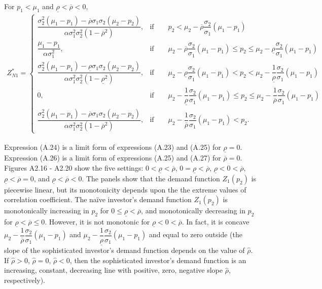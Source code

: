 \documentclass[10pt]{article}
\begin{document}
For $ p_1 < \mu_1 $ and $ \underline{\rho} < \overline{\rho} < 0 $,
{\footnotesize \begin{eqnarray}
Z_{N 1}^* = \left\{ \begin{matrix}
\dfrac{\sigma_2^2 (\mu_1 - p_1) - \overline{\rho} \sigma_1 \sigma_2 (\mu_2 - p_2)}{\alpha \sigma_1^2 \sigma_2^2 (1 - \overline{\rho}^2)}, & \text{if} \qquad p_2 < \mu_2 - \overline{\rho} \dfrac{\sigma_2}{\sigma_1} (\mu_1 - p_1) \\
\dfrac{\mu_1 - p_1}{\alpha \sigma_1^2}, & \text{if} \qquad \mu_2 - \overline{\rho} \dfrac{\sigma_2}{\sigma_1} (\mu_1 - p_1) \leqslant p_2 \leqslant \mu_2 - \underline{\rho} \dfrac{\sigma_2}{\sigma_1} (\mu_1 - p_1) \\
\dfrac{\sigma_2^2 (\mu_1 - p_1) - \underline{\rho} \sigma_1 \sigma_2 (\mu_2 - p_2)}{\alpha \sigma_1^2 \sigma_2^2 (1 - \underline{\rho}^2)}, & \text{if} \qquad \mu_2 - \underline{\rho} \dfrac{\sigma_2}{\sigma_1} (\mu_1 - p_1) < p_2 < \mu_2 - \dfrac1{\underline{\rho}} \dfrac{\sigma_2}{\sigma_1} (\mu_1 - p_1) \\
0, & \text{if} \qquad \mu_2 - \dfrac1{\underline{\rho}} \dfrac{\sigma_2}{\sigma_1} (\mu_1 - p_1) \leqslant p_2 \leqslant \mu_2 - \dfrac1{\overline{\rho}} \dfrac{\sigma_2}{\sigma_1} (\mu_1 - p_1) \\
\dfrac{\sigma_2^2 (\mu_1 - p_1) - \overline{\rho} \sigma_1 \sigma_2 (\mu_2 - p_2)}{\alpha \sigma_1^2 \sigma_2^2 (1 - \overline{\rho}^2)}, & \text{if} \qquad \mu_2 - \dfrac1{\overline{\rho}} \dfrac{\sigma_2}{\sigma_1} (\mu_1 - p_1) < p_2.
\end{matrix} \right.
\end{eqnarray}}

Expression (A.24) is a limit form of expressions (A.23) and (A.25) for $ \underline{\rho} = 0 $.
Expression (A.26) is a limit form of expressions (A.25) and (A.27) for $ \overline{\rho} = 0 $.
Figures A2.16 - A2.20 show the five settings: $ 0 < \underline{\rho} < \overline{\rho} $, $ 0 = \underline{\rho} < \overline{\rho} $, $ \underline{\rho} < 0 < \overline{\rho} $, $ \underline{\rho} < \overline{\rho} = 0 $, and $ \underline{\rho} < \overline{\rho} < 0 $. The panels show that the demand function $ Z_1 (p_2) $ is piecewise linear, but its monotonicity depends upon the the extreme values of correlation coefficient. The na\"ive investor's demand function $ Z_1 (p_2) $ is monotonically increasing in $ p_2 $ for $ 0 \leqslant \underline{\rho} < \overline{\rho} $, and monotonically decreasing in $ p_2 $ for $ \underline{\rho} < \overline{\rho} \leqslant 0 $. However, it is not monotonic for $ \underline{\rho} < 0 < \overline{\rho} $. In fact, it is concave $ \mu_2 - \dfrac1{\overline{\rho}} \dfrac{\sigma_2}{\sigma_1} (\mu_1 - p_1) $ and $ \mu_2 - \dfrac1{\underline{\rho}} \dfrac{\sigma_2}{\sigma_1} (\mu_1 - p_1) $ and equal to zero outside (the slope of the sophisticated investor's demand function depends on the value of $ \hat{\rho} $. If $ \hat{\rho} > 0 $, $ \hat{\rho} = 0 $, $ \hat{\rho} < 0 $, then the sophisticated investor's demand function is an increasing, constant, decreasing line with positive, zero, negative slope $ \hat{\rho} $, respectively).
\end{document}
